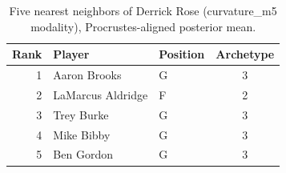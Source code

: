 \begin{table}[htbp]
  \centering\small
  \begin{tabular}{rllc}
    \toprule
    Rank & Player & Position & Archetype \\
    \midrule
    1 & Aaron Brooks & G & 3 \\
    2 & LaMarcus Aldridge & F & 2 \\
    3 & Trey Burke & G & 3 \\
    4 & Mike Bibby & G & 3 \\
    5 & Ben Gordon & G & 3 \\
    \bottomrule
  \end{tabular}
  \caption{Five nearest neighbors of Derrick Rose (curvature_m5 modality), Procrustes-aligned posterior mean.}
  \label{tab:Derrick_Rose_neighbors_curvature_m5}
\end{table}

